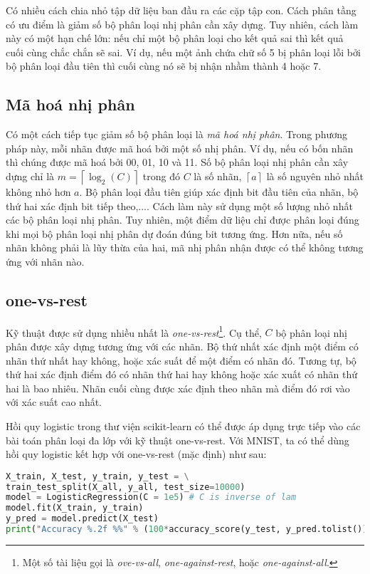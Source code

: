 Có nhiều cách chia nhỏ tập dữ liệu ban đầu ra các cặp tập con. Cách phân tầng có ưu điểm là giảm số bộ phân loại nhị phân cần xây dựng. Tuy nhiên, cách làm này có một hạn chế lớn: nếu chỉ một bộ phân loại cho kết quả sai thì kết quả cuối cùng chắc chắn sẽ sai. Ví dụ, nếu một ảnh chứa chữ
số {5} bị phân loại lỗi bởi bộ phân loại đầu tiên thì cuối cùng nó sẽ bị nhận nhầm thành 4 hoặc 7.


\subsection{Mã hoá nhị phân}
Có một cách tiếp tục giảm số bộ phân loại là \textit{mã hoá nhị phân}. Trong phương pháp này, mỗi nhãn được mã hoá bởi một số nhị phân. Ví dụ, nếu có bốn nhãn thì chúng được mã hoá bởi 00, 01, 10 và 11. Số bộ phân loại nhị phân cần xây dựng chỉ là $m =
\left\lceil\log_2(C)\right\rceil$ trong đó $C$ là số nhãn, $\left\lceil a
\right\rceil$ là {số nguyên nhỏ nhất không nhỏ hơn} $a$. Bộ phân loại đầu tiên giúp xác định bit đầu tiên của nhãn, bộ thứ hai xác định bit tiếp theo,....
Cách làm này sử dụng một số lượng nhỏ nhất các bộ phân loại nhị phân. Tuy
nhiên, một điểm dữ liệu chỉ được phân loại đúng khi mọi bộ phân loại nhị phân dự đoán đúng bit tương ứng. Hơn nữa, nếu số nhãn không phải là lũy thừa của hai,
mã nhị phân nhận được có thể không tương ứng với nhãn nào.


\subsection{one-vs-rest}
Kỹ thuật được sử dụng nhiều nhất là \textit{one-vs-rest}\footnote{Một số tài
liệu gọi là \textit{ove-vs-all}, \textit{one-against-rest}, hoặc
\textit{one-against-all}.}. Cụ thể, $C$ bộ phân loại nhị phân được xây dựng
tương ứng với các nhãn. Bộ thứ nhất xác định một điểm có nhãn thứ nhất hay
không, hoặc xác suất để một điểm có nhãn đó. Tương tự, bộ thứ hai xác định điểm
đó có nhãn thứ hai hay không hoặc xác xuất có nhãn thứ hai là bao nhiêu. Nhãn
cuối cùng được xác định theo nhãn mà điểm đó rơi vào với xác suất cao nhất.



Hồi quy logistic trong thư viện scikit-learn có thể được áp dụng trực tiếp
vào các bài toán phân loại đa lớp với kỹ thuật {one-vs-rest}. Với MNIST, ta có thể dùng hồi quy logistic kết hợp với one-vs-rest (mặc định) như sau:
\begin{lstlisting}[language=Python]
X_train, X_test, y_train, y_test = \
train_test_split(X_all, y_all, test_size=10000)
model = LogisticRegression(C = 1e5) # C is inverse of lam
model.fit(X_train, y_train)
y_pred = model.predict(X_test)
print("Accuracy %.2f %%" % (100*accuracy_score(y_test, y_pred.tolist())))
\end{lstlisting}

